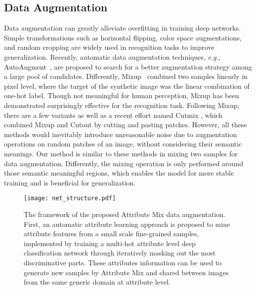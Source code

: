 \documentclass[runningheads]{llncs}
\begin{document}
\subsection{Data Augmentation}
\noindent Data augmentation can greatly alleviate overfitting in training deep networks. Simple transformations such as horizontal flipping, color space augmentations, and random cropping are widely used in recognition tasks to improve generalization. Recently, automatic data augmentation techniques, \emph{e.g.}, AutoAugment~\cite{cubuk2019autoaugment}, are proposed to search for a better augmentation strategy among a large pool of candidates. Differently, Mixup~\cite{zhang2017mixup} combined two samples linearly in pixel level, where the target of the synthetic image was the linear combination of one-hot label. Though not meaningful for human perception, Mixup has been demonstrated surprisingly effective for the recognition task. Following Mixup, there are a few variants \cite{verma2018manifold,guo2019mixup} as well as a recent effort named Cutmix \cite{yun2019cutmix}, which combined Mixup and Cutout \cite{devries2017improved} by cutting and pasting patches. However, all these methods would inevitably introduce unreasonable noise due to augmentation operations on random patches of an image, without considering their semantic meanings. Our method is similar to these methods in mixing two samples for data augmentation. Differently, the mixing operation is only performed around those semantic meaningful regions, which enables the model for more stable training and is beneficial for generalization.

\begin{figure*}[t]
  \begin{center}
        \texttt{[image: net\_structure.pdf]}
  \end{center}
  \vspace{-0.3cm}
     \caption{The framework of the proposed Attribute Mix data augmentation. First, an automatic attribute learning approach is proposed to mine attribute features from a small scale fine-grained samples, implemented by training a multi-hot attribute level deep classification network through iteratively masking out the most discriminative parts. These attributes information can be used to generate new samples by Attribute Mix and shared between images from the same generic domain at attribute level.}
  \label{net_structure}
  \vspace{-0.2cm}
\end{figure*}
\end{document}
